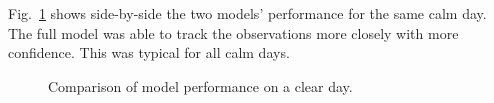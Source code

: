 Fig.~\ref{fig:disc_low} shows side-by-side the two models' performance for the same calm day. The full model was able to track the observations more closely with more confidence. This was typical for all calm days.
\begin{figure}[ht!]
    \centering
    \qquad
    \qquad
    \caption{Comparison of model performance on a clear day.
    \label{fig:disc_low}}
\end{figure}

